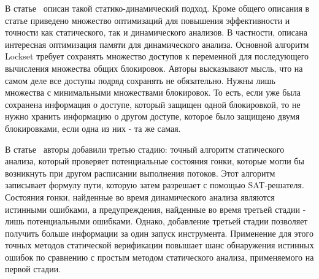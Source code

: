 В статье~\cite{Qi:2009:MPE} описан такой статико-динамический подход.
Кроме общего описания в статье приведено множество оптимизаций для повышения эффективности и точности как статического, так и динамического анализов.
В частности, описана интересная оптимизация памяти для динамического анализа. 
Основной алгоритм Lockset требует сохранять множество доступов к переменной для последующего вычисления множества общих блокировок.
Авторы высказывают мысль, что на самом деле все доступы подряд сохранять не обязательно.
Нужны лишь множества с минимальными множествами блокировок. То есть, если уже была сохранена информация о доступе, который защищен одной блокировкой, то не нужно хранить информацию о другом доступе, которое было защищено двумя блокировками, если одна из них - та же самая.

В статье~\cite{Yoga:2016:PDR} авторы добавили третью стадию: точный алгоритм статического анализа, который проверяет потенциальные состояния гонки, которые могли бы возникнуть при другом расписании выполнения потоков.
Этот алгоритм записывает формулу пути, которую затем разрешает с помощью SAT-решателя.
Состояния гонки, найденные во время динамического анализа являются истинными ошибками, а предупреждения, найденные во время третьей стадии - лишь потенциальными ошибками.
Однако, добавление третьей стадии позволяет получить больше информации за один запуск инструмента.
Применение для этого точных методов статической верификации повышает шанс обнаружения истинных ошибок по сравнению с простым методом статического анализа, применяемого на первой стадии.

